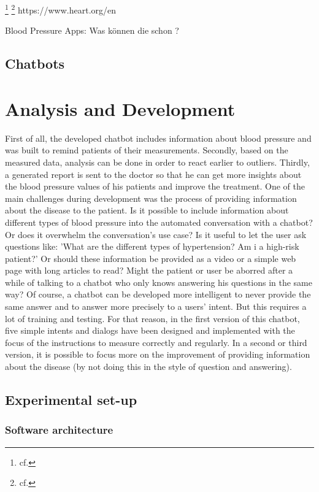 \footnote{cf.\autocite{lupton_mhealth}}
\footnote{cf.\autocite{lupton_apps}}
https://www.heart.org/en

Blood Pressure Apps:
Was können die schon ? 
\section{Chatbots} 




\chapter{Analysis and Development}
First of all, the developed chatbot includes information about blood pressure and was built to remind patients of their measurements. Secondly, based on the measured data, analysis can be done in order to react earlier to outliers. Thirdly, a generated report is sent to the doctor so that he can get more insights about the blood pressure values of his patients and improve the treatment.
One of the main challenges during development was the process of providing information about the disease to the patient. Is it possible to include information about different types of blood pressure into the automated conversation with a chatbot? Or does it overwhelm the conversation's use case? Is it useful to let the user ask questions like: 'What are the different types of hypertension? Am i a high-risk patient?' 
Or should these information be provided as a video or a simple web page with long articles to read? Might the patient or user be aborred after a while of talking to a chatbot who only knows answering his questions in the same way?
Of course, a chatbot can be developed more intelligent to never provide the same answer and to answer more precisely to a users' intent. But this requires a lot of training and testing. 
For that reason, in the first version of this chatbot, five simple intents and dialogs have been designed and implemented with the focus of the instructions to measure correctly and regularly. 
In a second or third version, it is possible to focus more on the improvement of providing information about the disease (by not doing this in the style of question and answering).

\section{Experimental set-up}

\subsection{Software architecture}

